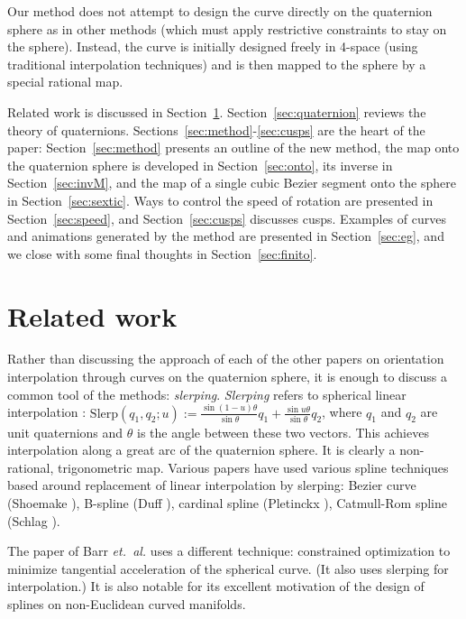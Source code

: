 Our method does not attempt to design the curve directly on the
quaternion sphere as in other methods (which must apply restrictive
constraints to stay on the sphere).
Instead, the curve is initially designed freely in 4-space
(using traditional interpolation techniques)
and is then mapped to the sphere by a special rational map.


Related work is discussed in Section~\ref{sec:related}.
Section~\ref{sec:quaternion} reviews the theory of quaternions.
Sections~\ref{sec:method}-\ref{sec:cusps} are the heart of the paper:
Section~\ref{sec:method} presents an outline of the new method,
the map onto the quaternion sphere is developed in Section~\ref{sec:onto},
its inverse in Section~\ref{sec:invM}, and the map of a single cubic Bezier
segment onto the sphere in Section~\ref{sec:sextic}.
Ways to control the speed of rotation are presented in Section~\ref{sec:speed},
and Section~\ref{sec:cusps} discusses cusps.
Examples of curves and animations generated by the method 
are presented in Section~\ref{sec:eg},
and we close with some final thoughts in Section~\ref{sec:finito}.

\section{Related work}
\label{sec:related}

Rather than discussing the approach of each of the other papers
on orientation interpolation through curves on the quaternion sphere,
it is enough to discuss a common tool of the methods: {\em slerping}.
{\em Slerping} refers to spherical linear interpolation
\cite{shoemake85}:
$\mbox{Slerp}(q_1,q_2;u) 
:= \frac{\sin (1-u) \theta}{\sin \theta} q_1 + 
   \frac{\sin u \theta}{\sin \theta} q_2$,
where $q_1$ and $q_2$ are unit quaternions and $\theta$
is the angle between these two vectors.
This achieves interpolation along a great arc of the quaternion sphere.
It is clearly a non-rational, trigonometric map.
Various papers have used various spline techniques based around replacement
of linear interpolation by slerping:
Bezier curve (Shoemake \cite{shoemake85}),
B-spline (Duff \cite{duff85}),
cardinal spline (Pletinckx \cite{pletinckx89}),
Catmull-Rom spline (Schlag \cite{schlag91}).

The paper of Barr {\em et.\ al.} \cite{barr92} uses a different technique:
constrained optimization to minimize
tangential acceleration of the spherical curve.
(It also uses slerping for interpolation.)
It is also notable for its excellent motivation of the
design of splines on non-Euclidean curved manifolds.

